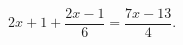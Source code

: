 \begin{ex}[type=equation]
	\begin{condition}
		$2x + 1 +\dfrac{2x - 1}{6} = \dfrac{7x - 13}{4}.$
	\end{condition}
\end{ex}